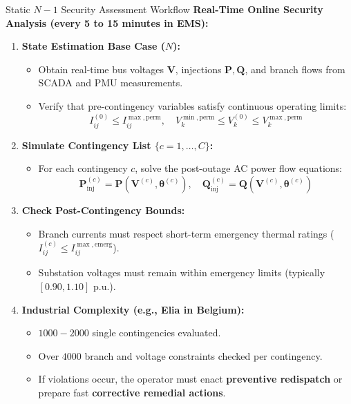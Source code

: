 \begin{frame}[allowframebreaks]{Static $N-1$ Security Assessment Workflow}
\footnotesize
\textbf{Real-Time Online Security Analysis (every 5 to 15 minutes in EMS):}
\begin{enumerate}
    \item \textbf{State Estimation Base Case ($N$):}
    \begin{itemize}
        \item Obtain real-time bus voltages $\mathbf{V}$, injections $\mathbf{P}, \mathbf{Q}$, and branch flows from SCADA and PMU measurements.
        \item Verify that pre-contingency variables satisfy continuous operating limits:
        \begin{equation*}
            I_{ij}^{(0)} \le I_{ij}^{\max,\text{perm}}, \quad V_k^{\min,\text{perm}} \le V_k^{(0)} \le V_k^{\max,\text{perm}}
        \end{equation*}
    \end{itemize}
    \item \textbf{Simulate Contingency List $\{c = 1, \dots, C\}$:}
    \begin{itemize}
        \item For each contingency $c$, solve the post-outage AC power flow equations:
        \begin{equation*}
            \mathbf{P}_{\text{inj}}^{(c)} = \mathbf{P}(\mathbf{V}^{(c)}, \boldsymbol{\theta}^{(c)}), \quad \mathbf{Q}_{\text{inj}}^{(c)} = \mathbf{Q}(\mathbf{V}^{(c)}, \boldsymbol{\theta}^{(c)})
        \end{equation*}
    \end{itemize}
    \item \textbf{Check Post-Contingency Bounds:}
    \begin{itemize}
        \item Branch currents must respect short-term emergency thermal ratings ($I_{ij}^{(c)} \le I_{ij}^{\max,\text{emerg}}$).
        \item Substation voltages must remain within emergency limits (typically $[0.90, 1.10]\text{ p.u.}$).
    \end{itemize}
    \item \textbf{Industrial Complexity (e.g., Elia in Belgium):}
    \begin{itemize}
        \item $1000 - 2000$ single contingencies evaluated.
        \item Over $4000$ branch and voltage constraints checked per contingency.
        \item If violations occur, the operator must enact \textbf{preventive redispatch} or prepare fast \textbf{corrective remedial actions}.
    \end{itemize}
\end{enumerate}
\end{frame}

